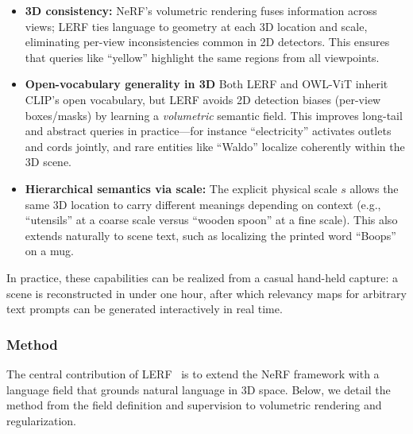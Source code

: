 \begin{enrichment}
\begin{enrichment}
        \begin{itemize}
            \item \textbf{3D consistency:} NeRF’s volumetric rendering fuses information across views; LERF ties language to geometry at each 3D location and scale, eliminating per-view inconsistencies common in 2D detectors. This ensures that queries like “yellow” highlight the same regions from all viewpoints.
            \item \textbf{Open-vocabulary generality in 3D} Both LERF and OWL-ViT inherit CLIP’s open vocabulary, but LERF avoids 2D detection biases (per-view boxes/masks) by learning a \emph{volumetric} semantic field. This improves long-tail and abstract queries in practice—for instance “electricity” activates outlets and cords jointly, and rare entities like “Waldo” localize coherently within the 3D scene.
            \item \textbf{Hierarchical semantics via scale:} The explicit physical scale $s$ allows the same 3D location to carry different meanings depending on context (e.g., “utensils” at a coarse scale versus “wooden spoon” at a fine scale). This also extends naturally to scene text, such as localizing the printed word “Boops” on a mug.
        \end{itemize}
        
        In practice, these capabilities can be realized from a casual hand-held capture: a scene is reconstructed in under one hour, after which relevancy maps for arbitrary text prompts can be generated interactively in real time.
        
        \subsubsection{Method}
        \label{subsec:chapter23_lerf_method}
        
        The central contribution of LERF~\cite{kerr2023_lerf} is to extend the NeRF framework with a language field that grounds natural language in 3D space. Below, we detail the method from the field definition and supervision to volumetric rendering and regularization.
        

\end{enrichment}
\end{enrichment}

